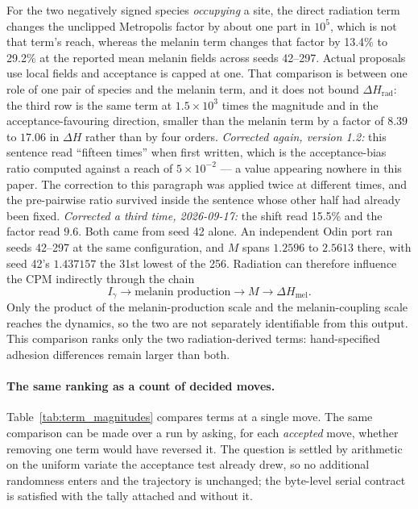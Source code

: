 \documentclass[11pt]{article}
\begin{document}
For the two negatively signed species \emph{occupying} a site, the direct radiation term changes
the unclipped Metropolis factor by about one part in $10^5$, which is not that term's reach, whereas the melanin term
changes that factor by 13.4\% to 29.2\% at the reported mean melanin fields across seeds 42--297. Actual proposals use local fields and acceptance is capped at one. That
comparison is between one role of one pair of species and the melanin term, and it does not bound
$\Delta H_{\mathrm{rad}}$: the third row is the same term at $1.5\times10^{3}$ times the magnitude
and in the acceptance-favouring direction, smaller than the melanin term by a factor of $8.39$ to
$17.06$ in
$\Delta H$ rather than by four orders. \emph{Corrected again, version 1.2:} this sentence read
``fifteen times'' when first written, which is the acceptance-bias ratio computed against a reach of
$5\times10^{-2}$ --- a value appearing nowhere in this paper. The correction to this paragraph was
applied twice at different times, and the pre-pairwise ratio survived inside the sentence whose other
half had already been fixed. \emph{Corrected a third time, 2026-09-17:} the shift read 15.5\% and
the factor read $9.6$. Both came from seed 42 alone. An independent Odin port ran seeds 42--297 at
the same configuration, and $M$ spans $1.2596$ to $2.5613$ there, with seed 42's $1.437157$ the
31st lowest of the 256. Radiation can therefore influence
the CPM indirectly through the chain
\[
I_\gamma \longrightarrow \text{melanin production} \longrightarrow M
\longrightarrow \Delta H_{\mathrm{mel}}.
\]
Only the product of the melanin-production scale and the melanin-coupling scale reaches the dynamics,
so the two are not separately identifiable from this output. This comparison ranks only the two
radiation-derived terms: hand-specified adhesion differences remain larger than both.

\paragraph{The same ranking as a count of decided moves.}
Table~\ref{tab:term_magnitudes} compares terms at a single move. The same comparison can be made
over a run by asking, for each \emph{accepted} move, whether removing one term would have reversed
it. The question is settled by arithmetic on the uniform variate the acceptance test already drew,
so no additional randomness enters and the trajectory is unchanged; the byte-level serial contract
is satisfied with the tally attached and without it.
\end{document}
